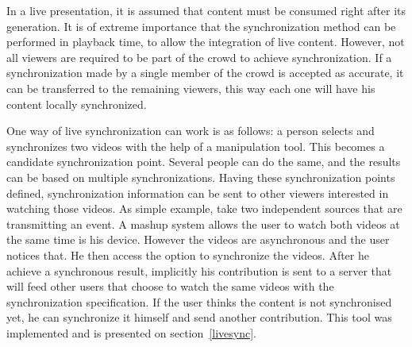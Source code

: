 In a live presentation, it is assumed that content must be consumed right after its generation. It is of extreme importance that the synchronization method can be performed in playback time, to allow the integration of live content. However, not all viewers are required to be part of the crowd to achieve synchronization. If a synchronization made by a single member of the crowd is accepted as accurate, it can be transferred to the remaining viewers, this way each one will have his content locally synchronized.

One way of live synchronization can work is as follows: a person selects and synchronizes two videos with the help of a manipulation tool. This becomes a candidate synchronization point. Several people can do the same, and the results can be based on multiple synchronizations. Having these synchronization points defined, synchronization information can be sent to other viewers interested in watching those videos. As simple example, take two independent sources that are transmitting an event. A mashup system allows the user to watch both videos at the same time is his device. However the videos are asynchronous and the user notices that. He then access the option to synchronize the videos. After he achieve a synchronous result, implicitly his contribution is sent to a server that will feed other users that choose to watch the same videos with the synchronization specification. If the user thinks the content is not synchronised yet, he can synchronize it himself and send another contribution. This tool was implemented and is presented on section~\ref{livesync}.





